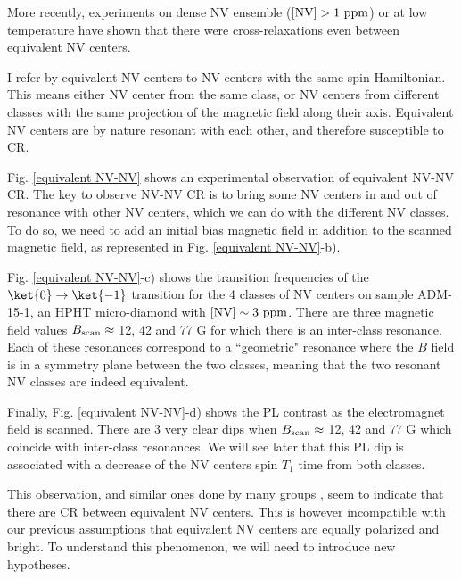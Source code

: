 \documentclass[a4paper,11pt]{report}
\begin{document}
More recently, experiments \citep{jarmola2012temperature, mrozek2015longitudinal, jarmola2015longitudinal, choi2017depolarization} on dense NV ensemble ($[\rm NV ] >1\ \rm ppm$) or at low temperature have shown that there were cross-relaxations even between equivalent NV centers.

I refer by equivalent NV centers to NV centers with the same spin Hamiltonian. This means either NV center from the same class, or NV centers from different classes with the same projection of the magnetic field along their axis. Equivalent NV centers are by nature resonant with each other, and therefore susceptible to CR.

Fig. \ref{equivalent NV-NV} shows an experimental observation of equivalent NV-NV CR. The key to observe NV-NV CR is to bring some NV centers in and out of resonance with other NV centers, which we can do with the different NV classes. To do so, we need to add an initial bias magnetic field in addition to the scanned magnetic field, as represented in Fig. \ref{equivalent NV-NV}-b). %

Fig. \ref{equivalent NV-NV}-c) shows the transition frequencies of the $\ket{0}\to\ket{-1}$ transition for the 4 classes of NV centers on sample ADM-15-1, an HPHT micro-diamond with $[\rm NV]\sim 3\ \rm ppm$. There are three magnetic field values $B_{\rm scan} \approx$ 12, 42 and 77 G for which there is an inter-class resonance. Each of these resonances correspond to a ``geometric" resonance where the $B$ field is in a symmetry plane between the two classes, meaning that the two resonant NV classes are indeed equivalent.

Finally, Fig. \ref{equivalent NV-NV}-d) shows the PL contrast as the electromagnet field is scanned. There are 3 very clear dips when $B_{\rm scan} \approx$ 12, 42 and 77 G which coincide with inter-class resonances. We will see later that this PL dip is associated with a decrease of the NV centers spin $T_1$ time from both classes.

This observation, and similar ones done by many groups \citep{jarmola2012temperature, mrozek2015longitudinal, choi2017depolarization, akhmedzhanov2017microwave, giri2018coupled}, seem to indicate that there are CR between equivalent NV centers. This is however incompatible with our previous assumptions that equivalent NV centers are equally polarized and bright. To understand this phenomenon, we will need to introduce new hypotheses.
\end{document}
